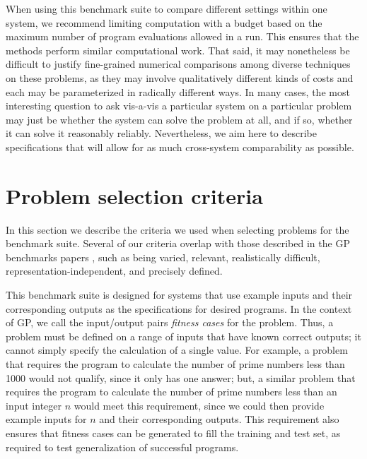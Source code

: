 \documentclass{sig-alternate}
\begin{document}
When using this benchmark suite to compare different settings within one system, we recommend limiting computation with a budget based on the maximum number of program evaluations allowed in a run. This ensures that the methods perform similar computational work. That said, it may nonetheless be difficult to justify fine-grained numerical comparisons among diverse techniques on these problems, as they may involve qualitatively different kinds of costs and each may be parameterized in radically different ways. In many cases, the most interesting question to ask vis-a-vis a particular system on a particular problem may just be whether the system can solve the problem at all, and if so,  whether it can solve it reasonably reliably. Nevertheless, we aim here to describe specifications that will allow for as much cross-system comparability as possible. %


\section{Problem selection criteria} \label{requirements}

In this section we describe the criteria we used when selecting problems for the benchmark suite. Several of our criteria overlap with those described in the GP benchmarks papers \cite{McDermott:2012:GECCO, White:2013:BGB:2441218.2441242}, such as being varied, relevant, realistically difficult, representation-independent, and precisely defined. 

This benchmark suite is designed for systems that use example inputs and their corresponding outputs as the specifications for desired programs. In the context of GP, we call the input/output pairs \textit{fitness cases} for the problem. Thus, a problem must be defined on a range of inputs that have known correct outputs; it cannot simply specify the calculation of a single value. For example, a problem that requires the program to calculate the number of prime numbers less than 1000 would not qualify, since it only has one answer; but, a similar problem that requires the program to calculate the number of prime numbers less than an input integer $n$ would meet this requirement, since we could then provide example inputs for $n$ and their corresponding outputs. This requirement also ensures that fitness cases can be generated to fill the training and test set, as required to test generalization of successful programs.
\end{document}

